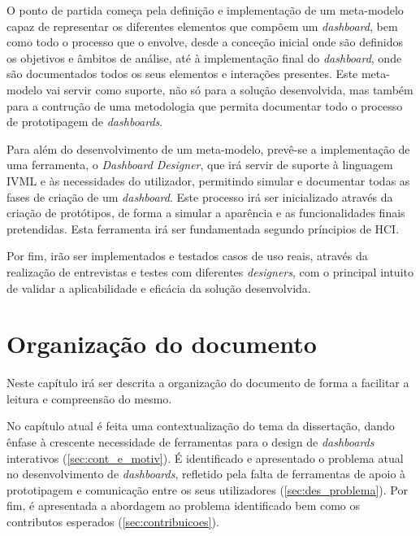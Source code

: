 O ponto de partida começa pela definição e implementação de um meta-modelo capaz de representar os diferentes elementos que compõem um \textit{dashboard}, bem como todo o processo que o envolve, desde a conceção inicial onde são definidos os objetivos e âmbitos de análise, até à implementação final do \textit{dashboard}, onde são documentados todos os seus elementos e interações presentes. Este meta-modelo vai servir como suporte, não só para a solução desenvolvida, mas também para a contrução de uma metodologia que permita documentar todo o processo de prototipagem de \textit{dashboards}.

Para além do desenvolvimento de um meta-modelo, prevê-se a implementação de uma ferramenta, o \textit{Dashboard Designer}, que irá servir de suporte à linguagem \gls{IVML} e às necessidades do utilizador, permitindo simular e documentar todas as fases de criação de um \textit{dashboard}. Este processo irá ser inicializado através da criação de protótipos, de forma a simular a aparência e as funcionalidades finais pretendidas. Esta ferramenta irá ser fundamentada segundo príncipios de \gls{HCI}.

Por fim, irão ser implementados e testados casos de uso reais, através da realização de entrevistas e testes com diferentes \textit{designers}, com o principal intuito de validar a aplicabilidade e eficácia da solução desenvolvida. 

\section{Organização do documento}
\label{sec:organizacao}

Neste capítulo irá ser descrita a organização do documento de forma a facilitar a leitura e compreensão do mesmo. 

No capítulo atual é feita uma contextualização do tema da dissertação, dando ênfase à crescente necessidade de ferramentas para o design de \textit{dashboards} interativos (\ref{sec:cont_e_motiv}). É identificado e apresentado o problema atual no desenvolvimento de \textit{dashboards}, refletido pela falta de ferramentas de apoio à prototipagem e comunicação entre os seus utilizadores (\ref{sec:des_problema}). Por fim, é apresentada a abordagem ao problema identificado bem como os contributos esperados (\ref{sec:contribuicoes}).


